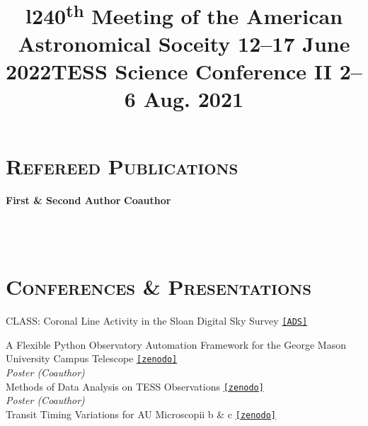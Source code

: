\documentclass[marg, centered]{res}
\begin{document}
\begin{resume}
\section{{\scshape \bfseries Refereed Publications}}

\nocite{*}
\textbf{First \& Second Author}
\vspace{0.05cm}
\printbibliography[title={First \& Second Author}, keyword={firstauthor}]
\textbf{Coauthor}
\vspace{0.05cm}
\printbibliography[title={Coauthor}, keyword={coauthor}, resetnumbers=true]



\begin{format}
\title{l} \\
 \\
\body
\end{format}

\section{{\scshape \bfseries Conferences \& Presentations}}


\title{\textbf{240\textsuperscript{th} Meeting of the American Astronomical Soceity} \hfill \textbf{12--17 June 2022}}
\begin{position}
CLASS: Coronal Line Activity in the Sloan Digital Sky Survey \href{https://ui.adsabs.harvard.edu/abs/2022AAS...24010113R/abstract}{\texttt{[ADS]}}
\end{position}

\vspace{-0.3cm}
\title{\textbf{TESS Science Conference II} \hfill \textbf{2--6 Aug. 2021}}
\begin{position}
A Flexible Python Observatory Automation Framework for the George Mason\\ University Campus Telescope \href{https://zenodo.org/record/5115310}{\texttt{[zenodo]}} \\
\textit{Poster (Coauthor)}\\
Methods of Data Analysis on TESS Observations \href{https://zenodo.org/record/5115310}{\texttt{[zenodo]}} \\
\textit{Poster (Coauthor)}\\
Transit Timing Variations for AU Microscopii b \& c \href{https://zenodo.org/record/5114040}{\texttt{[zenodo]}}
\end{position}


\end{resume}
\end{document}
